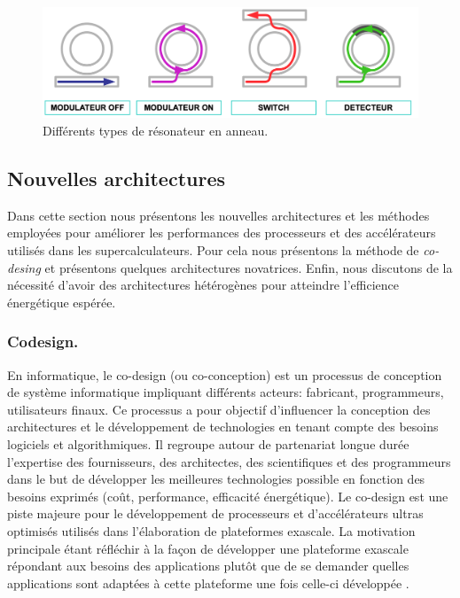         \begin{figure}
            \center
            \includegraphics[width=14cm]{images/edl_photo_ring.png}
            \caption{\label{fig:edl_photo_ring} Différents types de résonateur en anneau.}
        \end{figure}


\subsection{Nouvelles architectures}\label{sec:new_soc}
    
    Dans cette section nous présentons les nouvelles architectures et les méthodes employées pour améliorer les performances des processeurs et des accélérateurs utilisés dans les supercalculateurs. Pour cela nous présentons la méthode de \textit{co-desing} et présentons quelques architectures novatrices. Enfin, nous  discutons de la nécessité d'avoir des architectures hétérogènes pour atteindre l'efficience énergétique espérée.
    
    \subsubsection{Codesign.}\label{sec:codesign}
        
        En informatique, le co-design (ou co-conception) est un processus de conception de système informatique impliquant différents acteurs: fabricant, programmeurs, utilisateurs finaux. Ce processus a pour objectif d'influencer la conception des architectures et le développement de technologies en tenant compte des besoins logiciels et algorithmiques. Il regroupe autour de partenariat longue durée l'expertise des fournisseurs, des architectes, des scientifiques et des programmeurs dans le but de développer les meilleures technologies possible en fonction des besoins exprimés (coût, performance, efficacité énergétique). Le co-design est une piste majeure pour le développement de processeurs et d'accélérateurs ultras optimisés utilisés dans l'élaboration de plateformes \gls{exascale}. La motivation principale étant réfléchir à la façon de développer une plateforme exascale répondant aux besoins des applications plutôt que de se demander quelles applications sont adaptées à cette plateforme une fois celle-ci développée \cite{PARKERe2013}.
        
